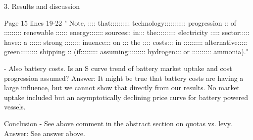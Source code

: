 3. Results and discussion 

Page 15 lines 19-22
 " Note, :::: that:::::::::: technology::::::::::: progression :: of
::::::::: renewable :::::: energy::::::: sources:: in::: the:::::::::: electricity ::::: sector::::: have:: a :::::: strong :::::::: inuence::: on ::: the
:::: costs::: in :::::::::: alternative::::: green::::::::: shipping :: (if::::::::: assuming::::::::: hydrogen::: or :::::::::: ammonia)."

-	Also battery costs. Is an S curve trend of battery market uptake and cost progression assumed?
Answer: It might be true that battery costs are having a large influence, but we cannot show that directly from our results. No market uptake included but an asymptotically declining price curve for battery powered vessels.

Conclusion
-	See above comment in the abstract section on quotas vs. levy. 
Answer: See answer above.
